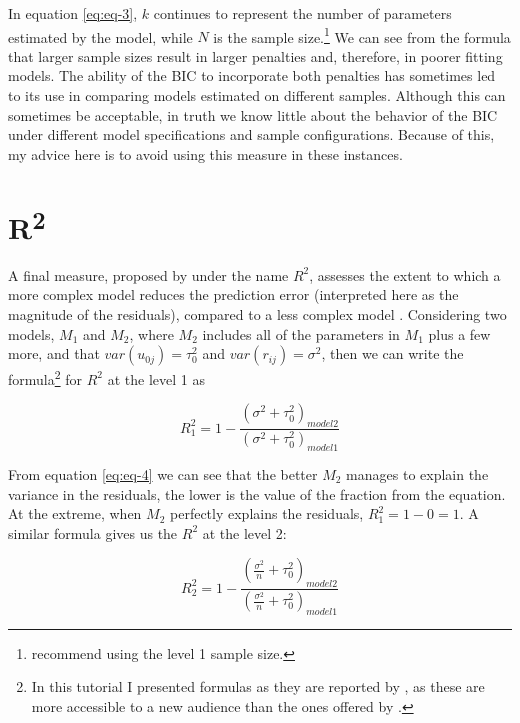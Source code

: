 \documentclass[12pt,english]{article}\usepackage[]{graphicx}\usepackage[usenames, dvipsnames]{xcolor}
\begin{document}
In equation \ref{eq:eq-3}, $k$ continues to represent the number of parameters estimated by the model, while $N$ is the sample size.\footnote{ recommend using the level 1 sample size.} We can see from the formula that larger sample sizes result in larger penalties and, therefore, in poorer fitting models. The ability of the BIC to incorporate both penalties has sometimes led to its use in comparing models estimated on different samples. Although this can sometimes be acceptable, in truth we know little about the behavior of the BIC under different model specifications and sample configurations. Because of this, my advice here is to avoid using this measure in these instances.




\section{R\textsuperscript{2}}

A final measure, proposed by  under the name $R^2$, assesses the extent to which a more complex model reduces the prediction error (interpreted here as the magnitude of the residuals), compared to a less complex model \cite[p.~35]{luke_multilevel_2004}. Considering two models, $M_1$ and $M_2$, where $M_2$ includes all of the parameters in $M_1$ plus a few more, and that $var(u_{0j})=\tau_0^2$ and $var(r_{ij})=\sigma^2$, then we can write the formula\footnote{In this tutorial I presented formulas as they are reported by \citeauthor[pp.~35--36]{luke_multilevel_2004}, as these are more accessible to a new audience than the ones offered by .} for $R^2$ at the level 1 as

\begin{equation}
\label{eq:eq-4}
R_1^2=1 - \frac{(\sigma^2 + \tau_0^2)_{model2}}{(\sigma^2 + \tau_0^2)_{model1}}
\end{equation}

From equation \ref{eq:eq-4} we can see that the better $M_2$ manages to explain the variance in the residuals, the lower is the value of the fraction from the equation. At the extreme, when $M_2$ perfectly explains the residuals, $R_1^2=1-0=1$. A similar formula gives us the $R^2$ at the level 2:

\begin{equation}
\label{eq:eq-5}
R_2^2=1 - \frac{(\frac{\sigma^2}{n}+\tau_0^2)_{model 2}}{(\frac{\sigma^2}{n}+\tau_0^2)_{model 1}}
\end{equation}
\end{document}
